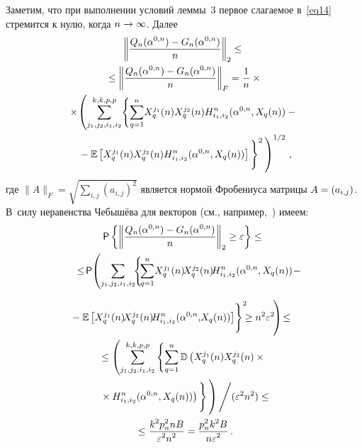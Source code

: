 \begin{multicols}{2}
Заметим, что при выполнении условий леммы~3 первое слагаемое в~\eqref{eq14} 
стремится к нулю, когда $n\hm\rightarrow\infty$. Далее
\begin{multline*}
\left\|\fr{Q_n(\alpha^{0,n})-G_n(\alpha^{0,n})}{n}\right\|_2\leq{}\\
{}\leq
\left\|\fr{Q_n(\alpha^{0,n})-G_n(\alpha^{0,n})}{n}\right\|_{F}=\fr{1}{n}\times{}\\
{}\times\!\left(\sum\limits_{j_1,j_2,i_1,i_2}^{k,k,p,p}\!\left\{
\sum\limits_{q=1}^n\!X_q^{j_1}(n)X_q^{j_2}(n)H^n_{i_1,i_2}(\alpha^{0,n}, X_q(n))-{}\right.\right.\\
\left.\left.{}-\E\left[X_q^{j_1}(n)X_q^{j_2}(n)H_{i_1,i_2}^n(\alpha^{0,n}, X_q(n))\right]
\vphantom{\sum\limits_{q=1}^n}
\right\}^2
\vphantom{\sum\limits_{j_1,j_2,i_1,i_2}^{k,k,p,p}}\right)^{1/2}\,,
\end{multline*}
где $\|A\|_F=\sqrt{\sum\limits_{i,j}(a_{i,j})^2}$ является нормой Фробениуса матрицы 
$A\hm=(a_{i,j})$. В~силу неравенства Чебышёва для векторов (см., например,~\cite{vectors}) 
имеем:
\begin{multline*}
\p\left\{\left\|\fr{Q_n(\alpha^{0,n})-G_n(\alpha^{0,n})}{n}\right\|_2\geq
\varepsilon\right\}\leq{}\\
{}\leq\!
\p\!\left(\sum\limits_{j_1,j_2,i_1,i_2}\!\!\left\{
\!\sum\limits_{q=1}^n\!X_q^{j_1}(n)\!X_q^{j_2}(n)\!H^n_{i_1,i_2}
(\alpha^{0,n}, X_q(n))\!-{}\right.\right.\hspace*{-12.14558pt}
\end{multline*}

\noindent
\begin{multline}
\hspace*{-3pt}\!\!\!\left.\left.{}-\E\left[X_q^{j_1}(n)\!X_q^{j_2}(n)\!H^n_{i_1,i_2}(\alpha^{0,n},\! X_q(n))
\right]\! \vphantom{\sum\limits_{q=1}^n}\right\}^2\!\!\!
\geq n^2 \varepsilon^2\!\right)\!\leq{}\hspace*{-0.7565pt}\\
{}\leq \left( \sum\limits_{j_1,j_2,i_1,i_2}^{k,k,p,p}\left\{
\sum\limits_{q=1}^n\mathbb{D}\left(X_q^{j_1}(n)X_q^{j_2}(n)\times{}\right.\right.\right.\\
\left.\left.\left.{}\times
H^n_{i_1,i_2}(\alpha^{0,n}, X_q(n))
\right) 
\vphantom{\sum\limits_{q=1}^n}\right\}
\vphantom{\sum\limits_{j_1,j_2,i_1,i_2}^{k,k,p,p}}\right)\Bigg / (\varepsilon^2n^2)
\leq{}\\
{}\leq\fr{k^2p_n^2nB}{\varepsilon^2n^2}=\fr{p_n^2k^2B}{n\varepsilon^2}\,.
\label{eq171}
\end{multline}


\end{multicols}
